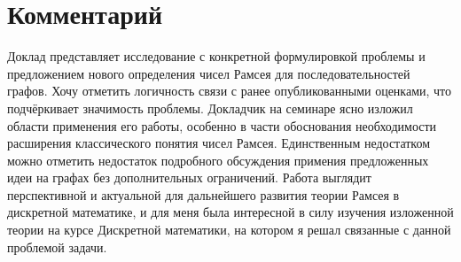 \documentclass[11pt]{article}
\begin{document}
\section*{Комментарий}
Доклад представляет исследование с конкретной формулировкой проблемы и предложением нового определения чисел Рамсея
для последовательностей графов. Хочу отметить логичность связи с ранее опубликованными оценками, что подчёркивает 
значимость проблемы. Докладчик на семинаре ясно изложил области применения его работы, особенно
в части обоснования необходимости расширения классического понятия чисел Рамсея. Единственным недостатком можно отметить
недостаток подробного обсуждения примения предложенных идеи на графах без дополнительных ограничений. Работа выглядит 
перспективной и актуальной для дальнейшего развития теории Рамсея в дискретной математике, и для меня была интересной в силу 
изучения изложенной теории на курсе Дискретной математики, на котором я решал связанные с данной проблемой задачи.
\end{document}

